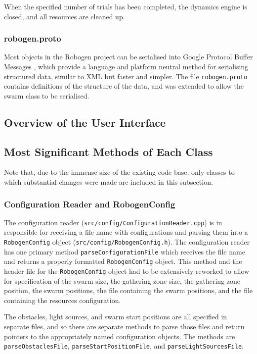 \documentclass[11pt,a4paper]{article}
\begin{document}
When the specified number of trials has been completed, the dynamics engine is
closed, and all resources are cleaned up.

\subsubsection{robogen.proto}
Most objects in the Robogen project can be serialised into Google Protocol Buffer
Messages \cite{protobuf}, which provide a language and platform neutral method
for serialising structured data, similar to XML but faster and simpler. The
file \texttt{robogen.proto} contains definitions of the structure of the data,
and was extended to allow the swarm class to be serialised.


\subsection{Overview of the User Interface}
\subsection{Most Significant Methods of Each Class}
Note that, due to the immense size of the existing code base, only classes
to which substantial changes were made are included in this subsection.

\subsubsection{Configuration Reader and RobogenConfig}
The configuration reader (\texttt{src/config/ConfigurationReader.cpp}) is in
responsible for receiving a file name with configurations and parsing them into
a \texttt{RobogenConfig} object (\texttt{src/config/RobogenConfig.h}). The
configuration reader has one primary method \texttt{parseConfigurationFile}
which receives the file name and returns a properly formatted
\texttt{RobogenConfig} object. This method and the header file for the
\texttt{RobogenConfig} object had to be extensively reworked to allow for
specification of the swarm size, the gathering zone size, the gathering zone
position, the swarm positions, the file containing the swarm positions, and the
file containing the resources configuration.

The obstacles, light sources, and swarm start positions are all specified in
separate files, and so there are separate methods to parse those files and
return pointers to the appropriately named configuration objects. The methods
are \texttt{parseObstaclesFile}, \texttt{parseStartPositionFile}, and
\texttt{parseLightSourcesFile}.
\end{document}
